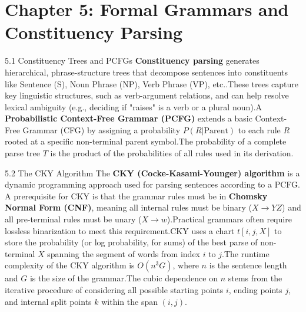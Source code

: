 \documentclass{article}
\begin{document}
\section{Chapter 5: Formal Grammars and Constituency Parsing}
5.1 Constituency Trees and PCFGs
\textbf{Constituency parsing} generates hierarchical, phrase-structure trees that decompose sentences into constituents like Sentence (S), Noun Phrase (NP), Verb Phrase (VP), etc..\footnotemark[1] These trees capture key linguistic structures, such as verb-argument relations, and can help resolve lexical ambiguity (e.g., deciding if "raises" is a verb or a plural noun).\footnotemark[1]
A \textbf{Probabilistic Context-Free Grammar (PCFG)} extends a basic Context-Free Grammar (CFG) by assigning a probability $P(R | \text{Parent})$ to each rule $R$ rooted at a specific non-terminal parent symbol.\footnotemark[1] The probability of a complete parse tree $T$ is the product of the probabilities of all rules used in its derivation.\footnotemark[1]

5.2 The CKY Algorithm
The \textbf{CKY (Cocke-Kasami-Younger) algorithm} is a dynamic programming approach used for parsing sentences according to a PCFG. A prerequisite for CKY is that the grammar rules must be in \textbf{Chomsky Normal Form (CNF)}, meaning all internal rules must be binary ($X \rightarrow YZ$) and all pre-terminal rules must be unary ($X \rightarrow w$).\footnotemark[1] Practical grammars often require lossless binarization to meet this requirement.\footnotemark[1]
CKY uses a chart $t[i, j, X]$ to store the probability (or log probability, for sums) of the best parse of non-terminal $X$ spanning the segment of words from index $i$ to $j$.\footnotemark[1] The runtime complexity of the CKY algorithm is $O(n^3 G)$, where $n$ is the sentence length and $G$ is the size of the grammar.\footnotemark[1] The cubic dependence on $n$ stems from the iterative procedure of considering all possible starting points $i$, ending points $j$, and internal split points $k$ within the span $(i, j)$.\footnotemark[1]
\end{document}
